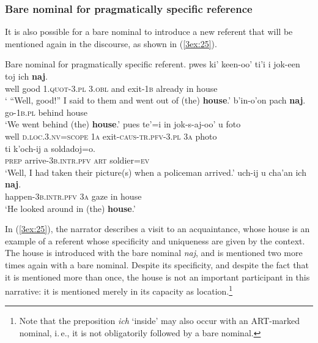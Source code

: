 \documentclass[output=paper]{langsci/langscibook}
\begin{document}
\subsubsection{Bare nominal for pragmatically specific reference}\label{3sec:335}

It is also possible for a bare nominal to introduce a new referent that will be mentioned again in the discourse, as shown in (\ref{3ex:25}).

\newpage
\begin{exe}
\ex\label{3ex:25}
Bare nominal for pragmatically specific referent. 
\exi{}
\gll	pwes 	ki'		keen-oo'			ti'i			i	jok-een		toj		ich	{\textbf{naj}}. \\
	well		good		{\textsc{1.quot-3.pl}}	{\textsc{3.obl}}	and	exit-{\textsc{1b}}	already	in	house \\
\glt	` ``Well, good!'' I said to them and went out of (the) {\textbf{house}}.'
\exi{}
\gll	b'in-o'on 		pach 	{\textbf{naj}}.  \\
	go-{\textsc{1b.pl}}	behind	house \\
\glt	`We went behind (the) {\textbf{house}}.'
\exi{}
\gll	pues te'=i					in 		jok-s-aj-oo'			u		foto \\
	well	{\textsc{d.loc.3.nv=scope}}	{\textsc{1a}} 	exit-{\textsc{caus-tr.pfv-3.pl}}	{\textsc{3a}}	photo \\
\glt
\exi{}
\gll	ti			k'och-ij				a	soldadoj=o. \\
	{\textsc{prep}}		arrive-{\textsc{3b.intr.pfv}}	{\textsc{art}}	soldier={\textsc{ev}} \\
\glt	`Well, I had taken their picture(s) when a policeman arrived.'
\exi{}
\gll	uch-ij 				u		cha'an	ich	{\textbf{naj}}.  \\
	happen-{\textsc{3b.intr.pfv}}	{\textsc{3a}}	gaze		in	house \\
\glt	`He looked around in (the) {\textbf{house}}.'
\end{exe}


In (\ref{3ex:25}), the narrator describes a visit to an acquaintance, whose house is an example of a referent whose specificity and uniqueness are given by the context.  The house is introduced with the bare nominal {\emph{naj}}, and is mentioned two more times again with a bare nominal.  Despite its specificity, and despite the fact that it is mentioned more than once, the house is not an important participant in this narrative: it is mentioned merely in its capacity as location.\footnote{Note that the preposition {\emph{ich}} `inside' may also occur with an ART-marked nominal, i.\,e., it is not obligatorily followed by a bare nominal.}
\end{document}

